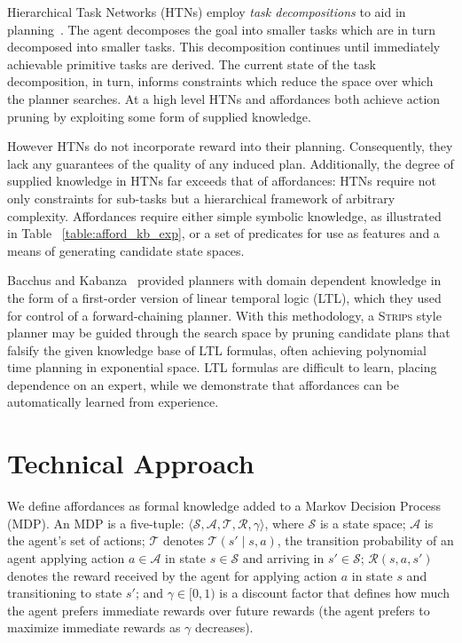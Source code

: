\documentclass[letterpaper]{article}
\begin{document}

Hierarchical Task Networks (HTNs) employ \textit{task decompositions}
to aid in planning~\cite{erol1994htn}. The agent decomposes the goal
into smaller tasks which are in turn decomposed into smaller
tasks. This decomposition continues until immediately achievable
primitive tasks are derived. The current state of the task
decomposition, in turn, informs constraints which reduce the space
over which the planner searches. At a high level HTNs and affordances
both achieve action pruning by exploiting some form of supplied
knowledge.

However HTNs do not incorporate reward into their
planning. Consequently, they lack any guarantees of the quality of any
induced plan.  Additionally, the degree of supplied knowledge in HTNs
far exceeds that of affordances: HTNs require not only constraints for
sub-tasks but a hierarchical framework of arbitrary
complexity. Affordances require either simple symbolic knowledge, as
illustrated in Table ~\ref{table:afford_kb_exp}, or a set of
predicates for use as features and a means of generating candidate
state spaces.


Bacchus and
Kabanza~\cite{Bacchus95usingtemporal,Bacchus99usingtemporal} provided
planners with domain dependent knowledge in the form of a first-order
version of linear temporal logic (LTL), which they used for control of
a forward-chaining planner. With this methodology, a \textsc{Strips}
style planner may be guided through the search space by pruning
candidate plans that falsify the given knowledge base of LTL formulas,
often achieving polynomial time planning in exponential space.  LTL
formulas are difficult to learn, placing dependence on an expert,
while we demonstrate that affordances can be automatically learned
from experience.

\section{Technical Approach}
\label{sec:affordances}

We define affordances as formal knowledge added to a Markov Decision
Process (MDP).  An MDP is a five-tuple: $\langle \mathcal{S},
\mathcal{A}, \mathcal{T}, \mathcal{R}, \gamma \rangle$, where
$\mathcal{S}$ is a state space; $\mathcal{A}$ is the agent's set of
actions; $\mathcal{T}$ denotes $\mathcal{T}(s' \mid s,a)$, the
transition probability of an agent applying action $a \in \mathcal{A}$
in state $s \in \mathcal{S}$ and arriving in $s' \in \mathcal{S}$;
$\mathcal{R}(s,a,s')$ denotes the reward received by the agent for
applying action $a$ in state $s$ and transitioning to state $s'$; and
$\gamma \in [0, 1)$ is a discount factor that defines how much the
  agent prefers immediate rewards over future rewards (the agent
  prefers to maximize immediate rewards as $\gamma$ decreases).
\end{document}
